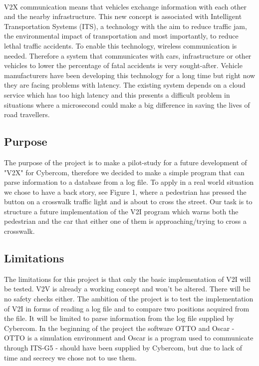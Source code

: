 \paragraph{}
V2X communication means that vehicles exchange information with each
other and the nearby infrastructure. This new concept is associated with Intelligent Transportation Systems (ITS), a technology with the aim to reduce traffic jam, the environmental impact of transportation and most importantly, to reduce lethal traffic accidents. To enable this technology, wireless communication is needed. Therefore a system that communicates with cars, infrastructure or other vehicles to lower the percentage of fatal accidents is very sought-after. Vehicle manufacturers have been developing this technology for a long time but right now they are facing problems with latency. The existing system depends on a cloud service which has too high latency and this presents a difficult problem in situations where a microsecond could make a big difference in saving the lives of road travellers.

\newpage
\subsection{Purpose}
The purpose of the project is to make a pilot-study for a future development of "V2X" for Cybercom, therefore we decided to make a simple program that can parse information to a database from a log file. To apply in a real world situation we chose to have a back story, see Figure 1, where a pedestrian has pressed the button on a crosswalk traffic light and is about to cross the street. Our task is to structure a future implementation of the V2I program which warns both the pedestrian and the car that either one of them is approaching/trying to cross a crosswalk.

\subsection{Limitations}
The limitations for this project is that only the basic implementation of V2I will be tested. V2V is already a working concept and won't be altered. There will be no safety checks either. The ambition of the project is to test the implementation of V2I in forms of reading a log file and to compare two positions acquired from the file. It will be limited to parse information from the log file supplied by Cybercom. In the beginning of the project the software OTTO and Oscar - OTTO is a simulation environment and Oscar is a program used to communicate through ITS-G5 - should have been supplied by Cybercom, but due to lack of time and secrecy we chose not to use them.  
